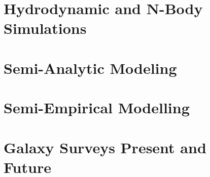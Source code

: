


\section{Hydrodynamic and N-Body Simulations}
\label{sec:Hydro}




\section{Semi-Analytic Modeling}
\label{sec:SAM}



\section{Semi-Empirical Modelling}
\label{sec:SEM}



\section{Galaxy Surveys Present and Future}
\label{sec:Surveys}





